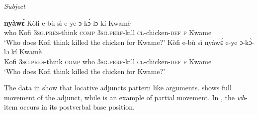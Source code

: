 \documentclass[output=paper]{langscibook}
\begin{document}
\ea\label{ex:devlin:embed-subj}\textit{Subject}
\begin{xlist} %
\ex \label{ex:devlin:embed-subj-scope}
\gll \textbf{ny\`{a}w\'{ɛ}} K\`{o}fi e-b\`{u} s\`{i} e-ye ɔ-k\`{ɔ}-lɔ k\'{i} Kwam\`{e}\\
who Kofi \textsc{3sg.pres}-think \textsc{comp} \textsc{3sg.perf}-kill \textsc{cl}-chicken-\textsc{def} \textsc{p} Kwame\\
\glt `Who does Kofi think killed the chicken for Kwame?’
\ex \label{ex:devlin:embed-subj-embedded}
\gll K\`{o}fi e-b\`{u} s\`{i} ny\`{a}w\'{ɛ} e-ye ɔ-k\`{ɔ}-lɔ k\'{i} Kwam\`{e}\\
Kofi \textsc{3sg.pres}-think \textsc{comp} who \textsc{3sg.perf}-kill \textsc{cl}-chicken-\textsc{def} \textsc{p} Kwame  \\
\glt `Who does Kofi think killed the chicken for Kwame?’
\end{xlist}
\z

\begin{sloppypar}
The data in  show that locative adjuncts pattern like arguments.  shows full movement of the adjunct, while  is an example of partial movement. In , the \textit{wh}-item occurs in its postverbal base position.  
\end{sloppypar}
\end{document}
